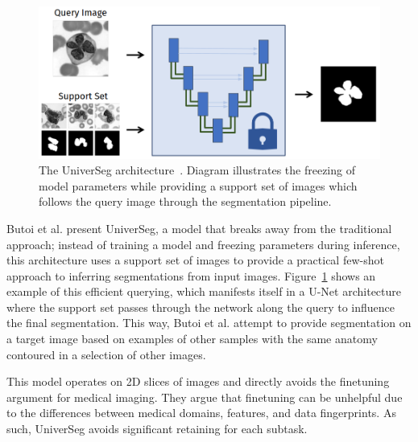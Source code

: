 \documentclass[12pt,twoside]{report}
\begin{document}
\begin{figure}[H]
  \centering
  \includegraphics[width=.5\linewidth]{../figures/universeg.png}
  \caption{The UniverSeg architecture~\cite{universeg}. Diagram illustrates the freezing of model parameters while providing a support set of images which follows the query image through the segmentation pipeline.}\label{fig:universeg}
\end{figure}

Butoi et al. present UniverSeg, a model that breaks away from the traditional approach; instead of training a model and freezing parameters during inference, this architecture uses a support set of images to provide a practical few-shot approach to inferring segmentations from input images. Figure~\ref{fig:universeg} shows an example of this efficient querying, which manifests itself in a U-Net architecture where the support set passes through the network along the query to influence the final segmentation. This way, Butoi et al. attempt to provide segmentation on a target image based on examples of other samples with the same anatomy contoured in a selection of other images.

This model operates on 2D slices of images and directly avoids the finetuning argument for medical imaging. They argue that finetuning can be unhelpful due to the differences between medical domains, features, and data fingerprints. As such, UniverSeg avoids significant retaining for each subtask.



\end{document}
